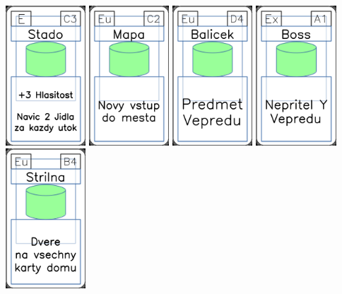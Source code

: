 \documentclass[a4paper]{article}
\begin{document}
	\includegraphics[width=3.0cm]{img-4_42}
	\includegraphics[width=3.0cm]{img-4_41}
	\includegraphics[width=3.0cm]{img-4_18}
	\includegraphics[width=3.0cm]{img-4_0}
	\includegraphics[width=3.0cm]{img-4_38}
\end{document}
